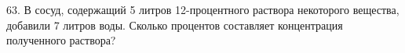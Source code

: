 63. В сосуд, содержащий 5 литров 12-процентного раствора некоторого вещества, добавили 7 литров воды. Сколько процентов составляет концентрация полученного раствора?\\
